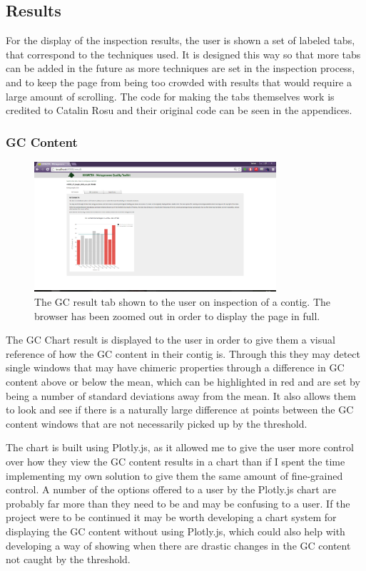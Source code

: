 \subsection{Results}
For the display of the inspection results, the user is shown a set of labeled tabs, that correspond to the techniques used. It is designed this way so that more tabs can be added in the future as more techniques are set in the inspection process, and to keep the page from being too crowded with results that would require a large amount of scrolling. The code for making the tabs themselves work is credited to Catalin Rosu\cite{tabcode} and their original code can be seen in the appendices.

\subsubsection{GC Content}
\begin{figure}[H]
	\centering
\includegraphics[width=0.8\textwidth]{images/ui5}
\caption{The GC result tab shown to the user on inspection of a contig. The browser has been zoomed out in order to display the page in full.}
\end{figure}

The GC Chart result is displayed to the user in order to give them a visual reference of how the GC content in their contig is. Through this they may detect single windows that may have chimeric properties through a difference in GC content above or below the mean, which can be highlighted in red and are set by being a number of standard deviations away from the mean. It also allows them to look and see if there is a naturally large difference at points between the GC content windows that are not necessarily picked up by the threshold.

The chart is built using Plotly.js\cite{plotly}, as it allowed me to give the user more control over how they view the GC content results in a chart than if I spent the time implementing my own solution to give them the same amount of fine-grained control. A number of the options offered to a user by the Plotly.js chart are probably far more than they need to be and may be confusing to a user. If the project were to be continued it may be worth developing a chart system for displaying the GC content without using Plotly.js, which could also help with developing a way of showing when there are drastic changes in the GC content not caught by the threshold.

